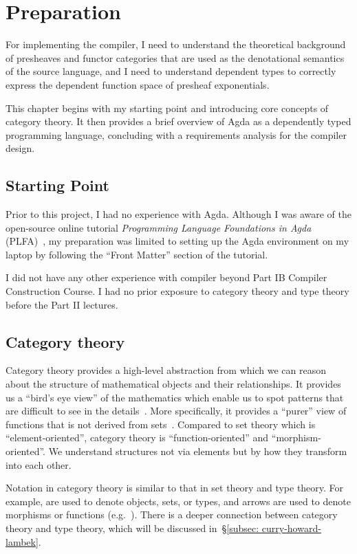 \documentclass[12pt,a4paper]{report}
\makeatletter
\theoremstyle{definition}
\newcommand{\secref}[1]{\S\ref{#1}}
\newcommand{\chapterminitoc}{%
  \begingroup
    \let\ps@plain\ps@empty %
    \let\ps@headings\ps@empty
    \minitoc
    \thispagestyle{empty} %
    \afterpage{\clearpage} %
  \endgroup
    \clearpage
  \addtocounter{page}{-1} %
}
\makeatother
\begin{document}
\chapter{Preparation}
    \chapterminitoc

    For implementing the compiler, I need to understand the theoretical background of presheaves and functor categories that are used as the denotational semantics of the source language, and I need to understand dependent types to correctly express the dependent function space of presheaf exponentials. 
    
    This chapter begins with my starting point and introducing core concepts of category theory. It then provides a brief overview of Agda as a dependently typed programming language, concluding with a requirements analysis for the compiler design.

    \section{Starting Point}
    Prior to this project, I had no experience with Agda. Although I was aware of the open-source online tutorial \textit{Programming Language Foundations in Agda} (PLFA)~\autocite{plfa}, my preparation was limited to setting up the Agda environment on my laptop by following the ``Front Matter'' section of the tutorial.

    I did not have any other experience with compiler beyond Part IB Compiler Construction Course. I had no prior exposure to category theory and type theory before the Part II lectures.


    \section{Category theory} \label{sec: cat}
        Category theory provides a high-level abstraction from which we can reason about the structure of mathematical objects and their relationships. It provides us a ``bird's eye view'' of the mathematics which enable us to spot patterns that are difficult to see in the details~\autocite{basic_cat}. More specifically, it provides a ``purer'' view of functions that is not derived from sets~\autocite{scott-lambda}. Compared to set theory which is ``element-oriented'', category theory is ``function-oriented'' and ``morphism-oriented''. We understand structures not via elements but by how they transform into each other. 

        Notation in category theory is similar to that in set theory and type theory. For example,  are used to denote objects, sets, or types, and arrows are used to denote morphisms or functions (e.g.\ ). There is a deeper connection between category theory and type theory, which will be discussed in~\secref{subsec: curry-howard-lambek}. 
\end{document}
